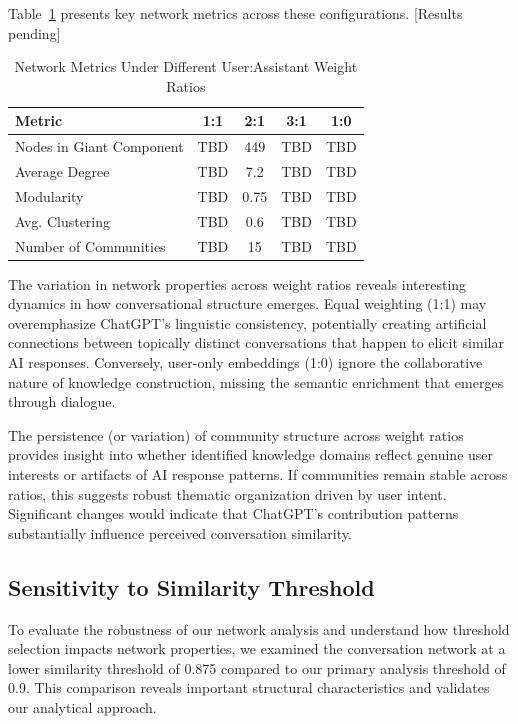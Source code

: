 \documentclass[10pt, a4paper]{article}
\begin{document}
Table~\ref{tab:weight_ablation} presents key network metrics across these configurations. [Results pending]

\begin{table}
\centering
\caption{Network Metrics Under Different User:Assistant Weight Ratios}
\label{tab:weight_ablation}
\begin{tabular}{lcccc}
\toprule
\textbf{Metric} & \textbf{1:1} & \textbf{2:1} & \textbf{3:1} & \textbf{1:0} \\
\midrule
Nodes in Giant Component & TBD & 449 & TBD & TBD \\
Average Degree & TBD & 7.2 & TBD & TBD \\
Modularity & TBD & 0.75 & TBD & TBD \\
Avg. Clustering & TBD & 0.6 & TBD & TBD \\
Number of Communities & TBD & 15 & TBD & TBD \\
\bottomrule
\end{tabular}
\end{table}

The variation in network properties across weight ratios reveals interesting dynamics in how conversational structure emerges. Equal weighting (1:1) may overemphasize ChatGPT's linguistic consistency, potentially creating artificial connections between topically distinct conversations that happen to elicit similar AI responses. Conversely, user-only embeddings (1:0) ignore the collaborative nature of knowledge construction, missing the semantic enrichment that emerges through dialogue.

The persistence (or variation) of community structure across weight ratios provides insight into whether identified knowledge domains reflect genuine user interests or artifacts of AI response patterns. If communities remain stable across ratios, this suggests robust thematic organization driven by user intent. Significant changes would indicate that ChatGPT's contribution patterns substantially influence perceived conversation similarity.

\subsection{Sensitivity to Similarity Threshold}

To evaluate the robustness of our network analysis and understand how threshold selection impacts network properties, we examined the conversation network at a lower similarity threshold of 0.875 compared to our primary analysis threshold of 0.9. This comparison reveals important structural characteristics and validates our analytical approach.
\end{document}

